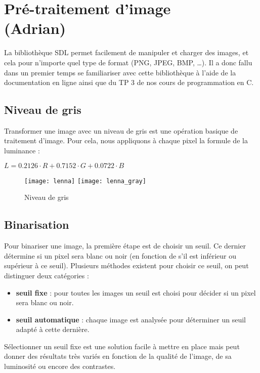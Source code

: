 \chapter{Pré-traitement d'image\\ (Adrian)}

La bibliothèque SDL permet facilement de manipuler et charger des images, et
cela pour n'importe quel type de format (PNG, JPEG, BMP, \ldots). Il a donc
fallu dans un premier temps se familiariser avec cette bibliothèque à l'aide de
la documentation en ligne ainsi que du TP 3 de nos cours de programmation en C.

\section{Niveau de gris}

Transformer une image avec un niveau de gris est une opération basique de
traitement d'image. Pour cela, nous appliquons à chaque pixel la formule de la
luminance :

$L = 0.2126 \cdot R + 0.7152 \cdot G + 0.0722 \cdot B$

\begin{figure}[H]
    \centering
    \texttt{[image: lenna]}
    \texttt{[image: lenna\_gray]}
    \caption{Niveau de gris}
\end{figure}

\section{Binarisation}

Pour binariser une image, la première étape est de choisir un seuil. Ce dernier
détermine si un pixel sera blanc ou noir (en fonction de s'il est inférieur ou
supérieur à ce seuil). Plusieurs méthodes existent pour choisir ce seuil, on
peut distinguer deux catégories :

\begin{itemize}
    \item \textbf{seuil fixe} : pour toutes les images un seuil est choisi pour
        décider si un pixel sera blanc ou noir.
    \item \textbf{seuil automatique} : chaque image est analysée pour déterminer
        un seuil adapté à cette dernière.
\end{itemize}

Sélectionner un seuil fixe est une solution facile à mettre en place mais peut
donner des résultats très variés en fonction de la qualité de l'image, de sa
luminosité ou encore des contrastes.

